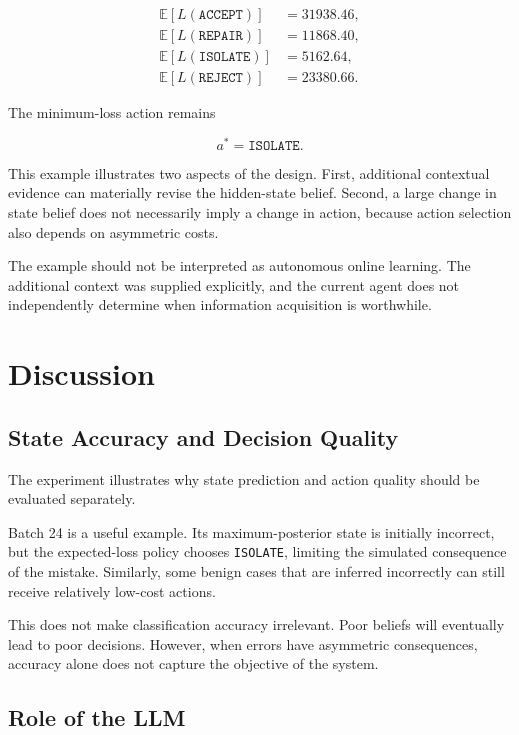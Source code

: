 \documentclass{article}
\begin{document}
\begin{align*}
\mathbb{E}[L(\texttt{ACCEPT})] &= 31938.46,\\
\mathbb{E}[L(\texttt{REPAIR})] &= 11868.40,\\
\mathbb{E}[L(\texttt{ISOLATE})] &= 5162.64,\\
\mathbb{E}[L(\texttt{REJECT})] &= 23380.66.
\end{align*}

The minimum-loss action remains

\[
a^*=\texttt{ISOLATE}.
\]

This example illustrates two aspects of the design. First, additional contextual evidence can materially revise the hidden-state belief. Second, a large change in state belief does not necessarily imply a change in action, because action selection also depends on asymmetric costs.

The example should not be interpreted as autonomous online learning. The additional context was supplied explicitly, and the current agent does not independently determine when information acquisition is worthwhile.


\section{Discussion}

\subsection{State Accuracy and Decision Quality}

The experiment illustrates why state prediction and action quality should be evaluated separately.

Batch 24 is a useful example. Its maximum-posterior state is initially incorrect, but the expected-loss policy chooses \texttt{ISOLATE}, limiting the simulated consequence of the mistake. Similarly, some benign cases that are inferred incorrectly can still receive relatively low-cost actions.

This does not make classification accuracy irrelevant. Poor beliefs will eventually lead to poor decisions. However, when errors have asymmetric consequences, accuracy alone does not capture the objective of the system.


\subsection{Role of the LLM}
\end{document}
